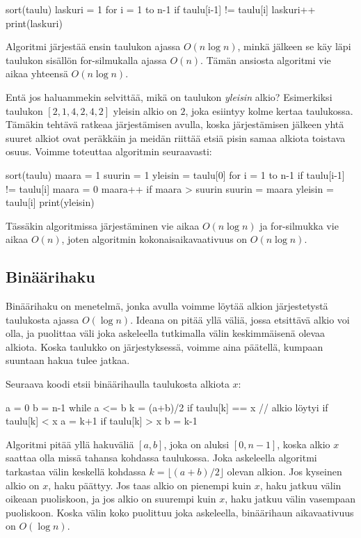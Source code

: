 \begin{code}
sort(taulu)
laskuri = 1
for i = 1 to n-1
    if taulu[i-1] != taulu[i]
        laskuri++
print(laskuri)
\end{code}

Algoritmi järjestää ensin taulukon ajassa $O(n \log n)$,
minkä jälkeen se käy läpi taulukon sisällön for-silmukalla
ajassa $O(n)$.
Tämän ansiosta algoritmi vie aikaa yhteensä $O(n \log n)$.


Entä jos haluammekin selvittää, mikä on taulukon \emph{yleisin} alkio?
Esimerkiksi taulukon $[2,1,4,2,4,2]$ yleisin alkio on $2$,
joka esiintyy kolme kertaa taulukossa.
Tämäkin tehtävä ratkeaa järjestämisen avulla, koska
järjestämisen jälkeen yhtä suuret alkiot ovat peräkkäin ja
meidän riittää etsiä pisin samaa alkiota toistava osuus.
Voimme toteuttaa algoritmin seuraavasti:

\begin{code}
sort(taulu)
maara = 1
suurin = 1
yleisin = taulu[0]
for i = 1 to n-1
    if taulu[i-1] != taulu[i]
        maara = 0
    maara++
    if maara > suurin
        suurin = maara
        yleisin = taulu[i]
print(yleisin)
\end{code}

Tässäkin algoritmissa järjestäminen vie aikaa $O(n \log n)$ ja
for-silmukka vie aikaa $O(n)$, joten algoritmin
kokonaisaikavaativuus on $O(n \log n)$.

\subsection{Binäärihaku}

Binäärihaku on menetelmä, jonka avulla voimme löytää alkion
järjestetystä taulukosta ajassa $O(\log n)$.
Ideana on pitää yllä väliä, jossa etsittävä alkio voi olla,
ja puolittaa väli joka askeleella tutkimalla välin
keskimmäisenä olevaa alkiota.
Koska taulukko on järjestyksessä, voimme aina päätellä,
kumpaan suuntaan hakua tulee jatkaa.

Seuraava koodi etsii binäärihaulla taulukosta alkiota $x$:

\begin{code}
a = 0
b = n-1
while a <= b
    k = (a+b)/2
    if taulu[k] == x
        // alkio löytyi
    if taulu[k] < x
        a = k+1
    if taulu[k] > x
        b = k-1
\end{code}

Algoritmi pitää yllä hakuväliä $[a,b]$, joka on aluksi $[0,n-1]$,
koska alkio $x$ saattaa olla missä tahansa kohdassa taulukossa.
Joka askeleella algoritmi tarkastaa välin keskellä kohdassa
$k=\lfloor (a+b)/2 \rfloor$ olevan alkion.
Jos kyseinen alkio on $x$, haku päättyy.
Jos taas alkio on pienempi kuin $x$, haku jatkuu välin
oikeaan puoliskoon,
ja jos alkio on suurempi kuin $x$, haku jatkuu välin
vasempaan puoliskoon.
Koska välin koko puolittuu joka askeleella,
binäärihaun aikavaativuus on $O(\log n)$.

